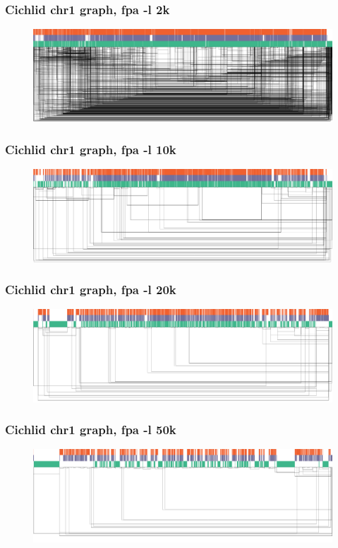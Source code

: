 \documentclass[aspectratio=169]{beamer}
\begin{document}
\begin{frame}[fragile]
  \frametitle{Cichlid chr1 graph, fpa -l 2k}
  \begin{figure}
    \includegraphics[scale=0.11,center]{cichlid-chr1-fpal2k-dg.png}
  \end{figure}
\end{frame}

\begin{frame}[fragile]
  \frametitle{Cichlid chr1 graph, fpa -l 10k}
  \begin{figure}
    \includegraphics[scale=0.11,center]{cichlid-chr1-fpal10k-dg.png}
  \end{figure}
\end{frame}

\begin{frame}[fragile]
  \frametitle{Cichlid chr1 graph, fpa -l 20k}
  \begin{figure}
    \includegraphics[scale=0.11,center]{cichlid-chr1-fpal20k-dg.png}
  \end{figure}
\end{frame}

\begin{frame}[fragile]
  \frametitle{Cichlid chr1 graph, fpa -l 50k}
  \begin{figure}
    \includegraphics[scale=0.11,center]{cichlid-chr1-fpal50k-dg.png}
  \end{figure}
\end{frame}
\end{document}
